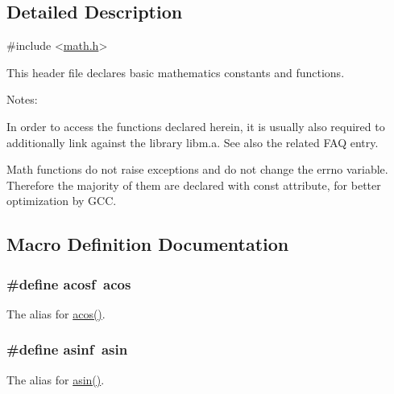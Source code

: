 \subsection{Detailed Description}

\begin{DoxyCode}
\textcolor{preprocessor}{#include <\hyperlink{math_8h}{math.h}>} 
\end{DoxyCode}


This header file declares basic mathematics constants and functions.

\begin{DoxyParagraph}{Notes\+:}

\begin{DoxyItemize}
\item In order to access the functions declared herein, it is usually also required to additionally link against the library {\ttfamily libm.\+a}. See also the related F\+AQ entry.
\item Math functions do not raise exceptions and do not change the {\ttfamily errno} variable. Therefore the majority of them are declared with const attribute, for better optimization by G\+CC. 
\end{DoxyItemize}
\end{DoxyParagraph}


\subsection{Macro Definition Documentation}
\subsubsection[{\texorpdfstring{acosf}{acosf}}]{\setlength{\rightskip}{0pt plus 5cm}\#define acosf~{\bf acos}}\hypertarget{group__avr__math_ga3e085dcc8e09f400136816dbc2a56a25}{}\label{group__avr__math_ga3e085dcc8e09f400136816dbc2a56a25}
The alias for \hyperlink{group__avr__math_gaa3a144378cb5470be25699ce14b5998b}{acos()}. 
\subsubsection[{\texorpdfstring{asinf}{asinf}}]{\setlength{\rightskip}{0pt plus 5cm}\#define asinf~{\bf asin}}\hypertarget{group__avr__math_ga68e4969cdd396dc3d4ad5abef13880b1}{}\label{group__avr__math_ga68e4969cdd396dc3d4ad5abef13880b1}
The alias for \hyperlink{group__avr__math_ga3d13e59a7e1b64fc5427ed1164356866}{asin()}. 
